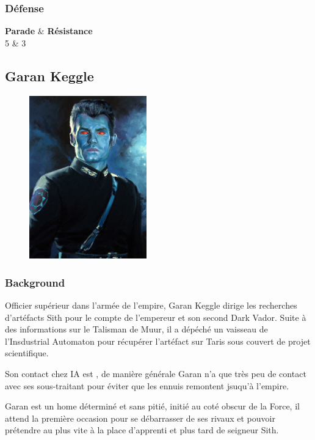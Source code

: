 \subsubsection{Défense}
\begin{itemtable}[ c c ]
    \textbf{Parade}     & \textbf{Résistance} \\
    5                   & 3 
\end{itemtable}

\newpage
\subsection{Garan Keggle}  \label{sec:garan-keggle}
\begin{figure}[h!]
    \centering
    \includegraphics[height=200pt]{_img/dos-au-muur/garan-keggle.png}
\end{figure}
\vspace{-1\baselineskip}
\subsubsection{Background}
Officier supérieur dans l'armée de l'empire, Garan Keggle dirige les recherches d'artéfacts Sith pour le compte de l'empereur et son second Dark Vador. Suite à des informations sur le Talisman de Muur, il a dépéché un vaisseau de l'Insdustrial Automaton pour récupérer l'artéfact sur Taris sous couvert de projet scientifique.

Son contact chez IA est , de manière générale Garan n'a que très peu de contact avec ses sous-traitant pour éviter que les ennuis remontent jsuqu'à l'empire. 

Garan est un home déterminé et sans pitié, initié au coté obscur de la Force, il attend la première occasion pour se débarrasser de ses rivaux et pouvoir prétendre au plus vite à la place d'apprenti et plus tard de seigneur Sith.

